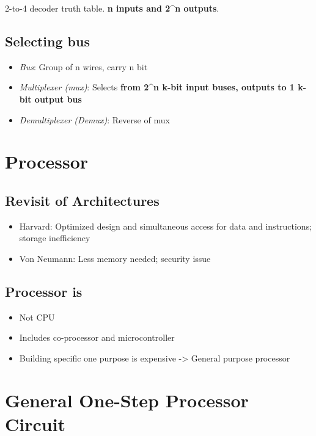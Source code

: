 \documentclass[11pt]{article}
\begin{document}
2-to-4 decoder truth table. \textbf{n inputs and 2\^{}n outputs}.

\subsection{Selecting bus}
\label{sec:orgabeba91}

\begin{itemize}
\item \emph{Bus}: Group of n wires, carry n bit
\item \emph{Multiplexer (mux)}: Selects \textbf{from 2\^{}n k-bit input buses, outputs to 1 k-bit output bus}
\item \emph{Demultiplexer (Demux)}: Reverse of mux
\end{itemize}

\section{Processor}
\label{sec:org7ab3ba0}

\subsection{Revisit of Architectures}
\label{sec:orgb486837}

\begin{itemize}
\item Harvard: Optimized design and simultaneous access for data and instructions; storage inefficiency
\item Von Neumann: Less memory needed; security issue
\end{itemize}

\subsection{Processor is}
\label{sec:org49629ea}

\begin{itemize}
\item Not CPU
\item Includes co-processor and microcontroller
\item Building specific one purpose is expensive -> General purpose processor
\end{itemize}

\section{General One-Step Processor Circuit}
\label{sec:orgfbd76a9}
\end{document}
